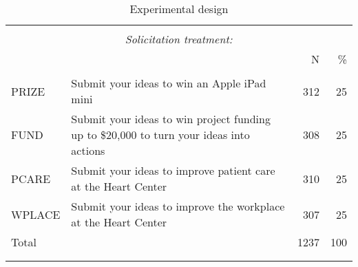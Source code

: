 \begin{table}
\centering
\caption{Experimental design}
\label{experimental-design}
\begin{tabular}{@{}lp{6cm}>{\raggedright}rr}
  \\[-1.8ex]\hline \hline \\[-1.8ex]
 & \multicolumn{1}{c}{\emph{Solicitation treatment:}}
						& \multicolumn{2}{c}{\emph{Employees:}}\\
						\cmidrule(lr){2-2}\cmidrule(lr){3-4} & 	 & N & \% \\ 
  \hline \\[-1.86ex]
PRIZE & Submit your ideas to win an Apple iPad mini & 312 & 25 \\ 
  [1.8ex] FUND & Submit your ideas to win project funding up to \$20,000 
			to turn your ideas into actions & 308 & 25 \\ 
  [1.8ex] PCARE & Submit your ideas to improve patient care at the Heart Center & 310 & 25 \\ 
  [1.8ex] WPLACE & Submit your ideas to improve the workplace at the Heart Center & 307 & 25 \\ 
  [1.8ex] Total &  & 1237 & 100 \\ 
   \\[-1.8ex]\hline \hline \\[-1.8ex]
\end{tabular}
\end{table}
